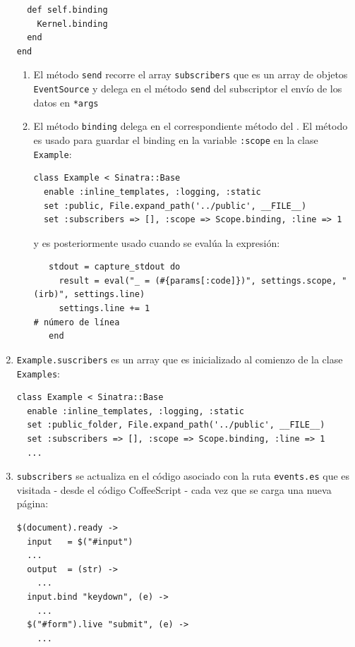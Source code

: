 \begin{enumerate}
\begin{verbatim}
  def self.binding
    Kernel.binding
  end
end
\end{verbatim}
\begin{enumerate}
\item El método \verb|send| recorre el array \verb|subscribers|
que es un array de objetos \verb|EventSource| y delega en el método 
\verb|send| del subscriptor el envío de los datos en \verb|*args|
\item 
El método \verb|binding| 
delega en el correspondiente método del \Kernel{}.
El método es usado para guardar el binding 
en la variable \verb|:scope| en la clase \verb|Example|:
\begin{verbatim}
class Example < Sinatra::Base
  enable :inline_templates, :logging, :static
  set :public, File.expand_path('../public', __FILE__)
  set :subscribers => [], :scope => Scope.binding, :line => 1
\end{verbatim}
y es posteriormente usado cuando se evalúa la expresión:
\begin{verbatim}
   stdout = capture_stdout do
     result = eval("_ = (#{params[:code]})", settings.scope, "(irb)", settings.line)
     settings.line += 1                                            # número de línea
   end
\end{verbatim}
\end{enumerate}
\item 
\verb|Example.suscribers| es un array que es inicializado al comienzo de la clase 
\verb|Examples|:
\begin{verbatim}
class Example < Sinatra::Base
  enable :inline_templates, :logging, :static
  set :public_folder, File.expand_path('../public', __FILE__)
  set :subscribers => [], :scope => Scope.binding, :line => 1
  ...
\end{verbatim}
\item  \verb|subscribers| se actualiza en el código asociado con la ruta \verb|events.es|
que es visitada - desde el código CoffeeScript - cada vez que se carga una nueva página:
\begin{verbatim}
$(document).ready ->
  input   = $("#input")
  ...
  output  = (str) ->
    ...
  input.bind "keydown", (e) ->
    ...
  $("#form").live "submit", (e) ->
    ...


\end{verbatim}
\end{enumerate}
